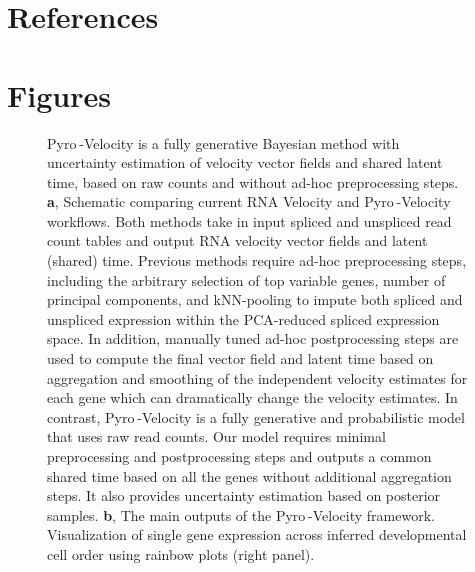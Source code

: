 \documentclass[
  sn-mathphys-num,
  lineno,
  twocolumn]{sn-jnl}
\let\oldincludegraphics\includegraphics
\renewcommand{\includegraphics}[2][]{\oldincludegraphics[#1,keepaspectratio]{#2}}
\begin{document}
\section*{References}\label{references}

\renewcommand{\bibsection}{}


\FloatBarrier

\newpage{}

\onecolumn

\section{Figures}\label{figures}

\begin{figure}


\caption{\label{fig-model}Pyro -Velocity is a fully generative Bayesian
method with uncertainty estimation of velocity vector fields and shared
latent time, based on raw counts and without ad-hoc preprocessing steps.
\textbf{a}, Schematic comparing current RNA Velocity and Pyro -Velocity
workflows. Both methods take in input spliced and unspliced read count
tables and output RNA velocity vector fields and latent (shared) time.
Previous methods require ad-hoc preprocessing steps, including the
arbitrary selection of top variable genes, number of principal
components, and kNN-pooling to impute both spliced and unspliced
expression within the PCA-reduced spliced expression space. In addition,
manually tuned ad-hoc postprocessing steps are used to compute the final
vector field and latent time based on aggregation and smoothing of the
independent velocity estimates for each gene which can dramatically
change the velocity estimates. In contrast, Pyro -Velocity is a fully
generative and probabilistic model that uses raw read counts. Our model
requires minimal preprocessing and postprocessing steps and outputs a
common shared time based on all the genes without additional aggregation
steps. It also provides uncertainty estimation based on posterior
samples. \textbf{b}, The main outputs of the Pyro -Velocity framework.
Visualization of single gene expression across inferred developmental
cell order using rainbow plots (right panel).}

\end{figure}%
\end{document}
